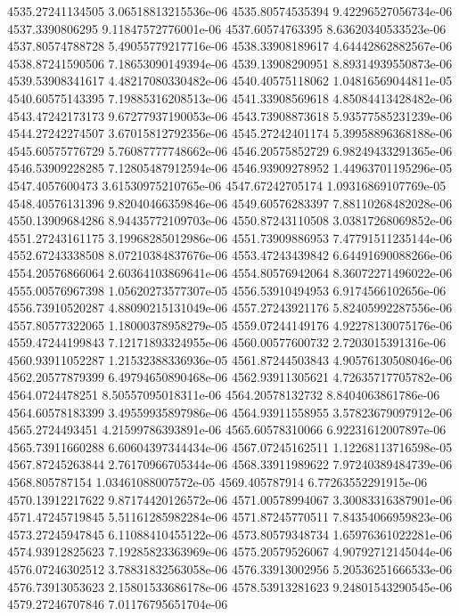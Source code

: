 {4535.27241134505 3.06518813215536e-06
4535.80574535394 9.42296527056734e-06
4537.3390806295 9.11847572776001e-06
4537.60574763395 8.63620340533523e-06
4537.80574788728 5.49055779217716e-06
4538.33908189617 4.64442862882567e-06
4538.87241590506 7.18653090149394e-06
4539.13908290951 8.89314939550873e-06
4539.53908341617 4.48217080330482e-06
4540.40575118062 1.04816569044811e-05
4540.60575143395 7.19885316208513e-06
4541.33908569618 4.85084413428482e-06
4543.47242173173 9.67277937190053e-06
4543.73908873618 5.93577585231239e-06
4544.27242274507 3.67015812792356e-06
4545.27242401174 5.39958896368188e-06
4545.60575776729 5.76087777748662e-06
4546.20575852729 6.98249433291365e-06
4546.53909228285 7.12805487912594e-06
4546.93909278952 1.44963701195296e-05
4547.4057600473 3.61530975210765e-06
4547.67242705174 1.09316869107769e-05
4548.40576131396 9.82040466359846e-06
4549.60576283397 7.88110268482028e-06
4550.13909684286 8.94435772109703e-06
4550.87243110508 3.03817268069852e-06
4551.27243161175 3.19968285012986e-06
4551.73909886953 7.47791511235144e-06
4552.67243338508 8.07210384837676e-06
4553.47243439842 6.64491690088266e-06
4554.20576866064 2.60364103869641e-06
4554.80576942064 8.36072271496022e-06
4555.00576967398 1.05620273577307e-05
4556.53910494953 6.9174566102656e-06
4556.73910520287 4.88090215131049e-06
4557.27243921176 5.82405992287556e-06
4557.80577322065 1.18000378958279e-05
4559.07244149176 4.92278130075176e-06
4559.47244199843 7.12171893324955e-06
4560.00577600732 2.7203015391316e-06
4560.93911052287 1.21532388336936e-05
4561.87244503843 4.90576130508046e-06
4562.20577879399 6.49794650890468e-06
4562.93911305621 4.72635717705782e-06
4564.0724478251 8.50557095018311e-06
4564.20578132732 8.8404063861786e-06
4564.60578183399 3.49559935897986e-06
4564.93911558955 3.57823679097912e-06
4565.2724493451 4.21599786393891e-06
4565.60578310066 6.92231612007897e-06
4565.73911660288 6.60604397344434e-06
4567.07245162511 1.12268113716598e-05
4567.87245263844 2.76170966705344e-06
4568.33911989622 7.97240389484739e-06
4568.805787154 1.03461088007572e-05
4569.405787914 6.77263552291915e-06
4570.13912217622 9.87174420126572e-06
4571.00578994067 3.30083316387901e-06
4571.47245719845 5.51161285982284e-06
4571.87245770511 7.84354066959823e-06
4573.27245947845 6.11088410455122e-06
4573.80579348734 1.65976361022281e-06
4574.93912825623 7.19285823363969e-06
4575.20579526067 4.90792712145044e-06
4576.07246302512 3.78831832563058e-06
4576.33913002956 5.20536251666533e-06
4576.73913053623 2.15801533686178e-06
4578.53913281623 9.24801543290545e-06
4579.27246707846 7.01176795651704e-06
}
